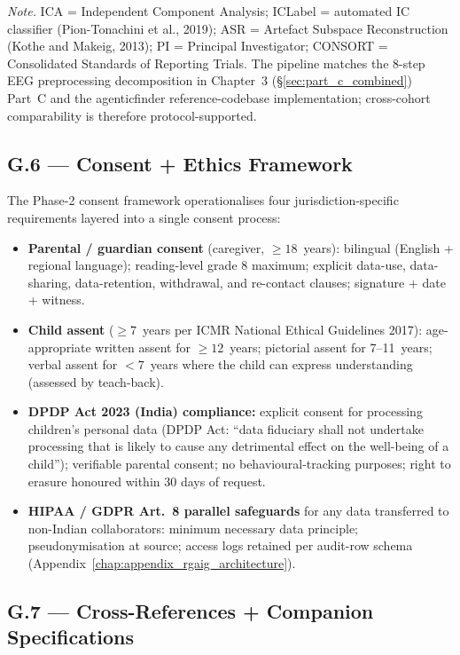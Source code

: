\vspace{0.3em}\noindent\textit{Note.} ICA = Independent Component Analysis; ICLabel = automated IC classifier (Pion-Tonachini et al., 2019); ASR = Artefact Subspace Reconstruction (Kothe and Makeig, 2013); PI = Principal Investigator; CONSORT = Consolidated Standards of Reporting Trials. The pipeline matches the 8-step EEG preprocessing decomposition in Chapter~3 (§\ref{sec:part_c_combined}) Part~C and the agenticfinder reference-codebase implementation; cross-cohort comparability is therefore protocol-supported.

\subsection*{G.6 --- Consent + Ethics Framework}
\label{subsec:appg_consent_ethics}

The Phase-2 consent framework operationalises four jurisdiction-specific requirements layered into a single consent process:

\begin{itemize}[leftmargin=*, itemsep=3pt]
    \item \textbf{Parental / guardian consent} (caregiver, $\geq 18$~years): bilingual (English + regional language); reading-level grade 8 maximum; explicit data-use, data-sharing, data-retention, withdrawal, and re-contact clauses; signature + date + witness.
    \item \textbf{Child assent} ($\geq 7$~years per ICMR National Ethical Guidelines 2017): age-appropriate written assent for $\geq 12$~years; pictorial assent for 7--11~years; verbal assent for $<7$~years where the child can express understanding (assessed by teach-back).
    \item \textbf{DPDP Act 2023 (India) compliance:} explicit consent for processing children's personal data (DPDP Act: ``data fiduciary shall not undertake processing that is likely to cause any detrimental effect on the well-being of a child''); verifiable parental consent; no behavioural-tracking purposes; right to erasure honoured within 30 days of request.
    \item \textbf{HIPAA / GDPR Art.~8 parallel safeguards} for any data transferred to non-Indian collaborators: minimum necessary data principle; pseudonymisation at source; access logs retained per audit-row schema (Appendix~\ref{chap:appendix_rgaig_architecture}).
\end{itemize}

\subsection*{G.7 --- Cross-References + Companion Specifications}
\label{subsec:appg_cross_refs}

